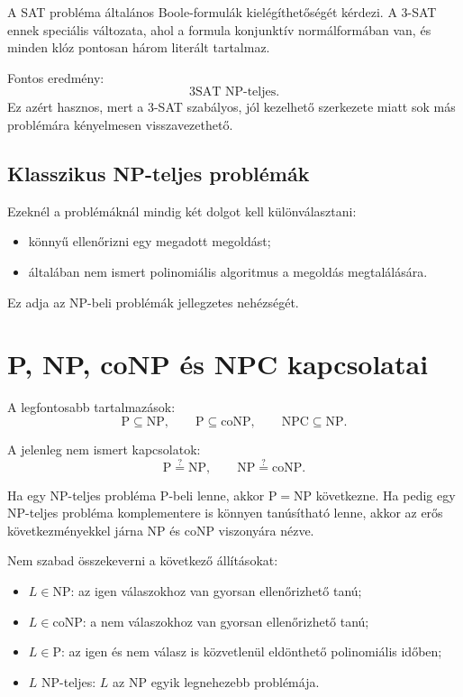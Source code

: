 A SAT probléma általános Boole-formulák kielégíthetőségét kérdezi. A 3-SAT ennek speciális változata, ahol a formula konjunktív normálformában van, és minden klóz pontosan három literált tartalmaz.

Fontos eredmény:
\[
  \mathrm{3SAT}\text{ NP-teljes.}
\]
Ez azért hasznos, mert a 3-SAT szabályos, jól kezelhető szerkezete miatt sok más problémára kényelmesen visszavezethető.

\subsection{Klasszikus NP-teljes problémák}

\begin{center}

\end{center}

Ezeknél a problémáknál mindig két dolgot kell különválasztani:

\begin{itemize}
  \item könnyű ellenőrizni egy megadott megoldást;
  \item általában nem ismert polinomiális algoritmus a megoldás megtalálására.
\end{itemize}

Ez adja az $\mathrm{NP}$-beli problémák jellegzetes nehézségét.

\section{P, NP, coNP és NPC kapcsolatai}

A legfontosabb tartalmazások:
\[
  \mathrm{P}\subseteq\mathrm{NP},
  \qquad
  \mathrm{P}\subseteq\mathrm{coNP},
  \qquad
  \mathrm{NPC}\subseteq\mathrm{NP}.
\]

A jelenleg nem ismert kapcsolatok:
\[
  \mathrm{P}\stackrel{?}{=}\mathrm{NP},
  \qquad
  \mathrm{NP}\stackrel{?}{=}\mathrm{coNP}.
\]

Ha egy NP-teljes probléma $\mathrm{P}$-beli lenne, akkor $\mathrm{P}=\mathrm{NP}$ következne. Ha pedig egy NP-teljes probléma komplementere is könnyen tanúsítható lenne, akkor az erős következményekkel járna $\mathrm{NP}$ és $\mathrm{coNP}$ viszonyára nézve.

\begin{warningbox}
Nem szabad összekeverni a következő állításokat:
\begin{itemize}
  \item $L\in\mathrm{NP}$: az igen válaszokhoz van gyorsan ellenőrizhető tanú;
  \item $L\in\mathrm{coNP}$: a nem válaszokhoz van gyorsan ellenőrizhető tanú;
  \item $L\in\mathrm{P}$: az igen és nem válasz is közvetlenül eldönthető polinomiális időben;
  \item $L$ NP-teljes: $L$ az $\mathrm{NP}$ egyik legnehezebb problémája.
\end{itemize}
\end{warningbox}

